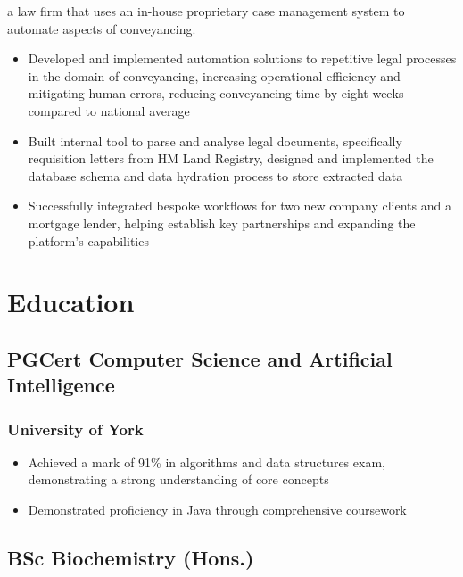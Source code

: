 \documentclass{article}
\begin{document}
\begin{paracol}{2}
  {\noindent\small a law firm that uses an in-house proprietary case management system to automate aspects of conveyancing.}
  \begin{itemize}[leftmargin=*]
    \setlength\itemsep{-2pt}
    \item Developed and implemented automation solutions to repetitive legal processes in the domain of conveyancing, increasing operational efficiency and mitigating human errors, reducing conveyancing time by eight weeks compared to national average {\color{LightGrey}\scriptsize\href{https://www.juno.legal/information/how-long-does-conveyancing-take/}{\faExternalLink}}
    \item Built internal tool to parse and analyse legal documents, specifically requisition letters from HM Land Registry, designed and implemented the database schema and data hydration process to store extracted data
    \item Successfully integrated bespoke workflows for two new company clients and a mortgage lender, helping establish key partnerships and expanding the platform's capabilities
  \end{itemize}

  \section{Education}
  \subsection{PGCert Computer Science and Artificial Intelligence}
  \subsubsection{University of York}
  \hspace*{\fill}{\small Awarded 2023}
  \begin{itemize}[leftmargin=*]
    \setlength\itemsep{-2pt}
    \item Achieved a mark of 91\% in algorithms and data structures exam, demonstrating a strong understanding of core concepts
    \item Demonstrated proficiency in Java through comprehensive coursework
  \end{itemize}

  \subsection{BSc Biochemistry (Hons.)}

\end{paracol}
\end{document}
